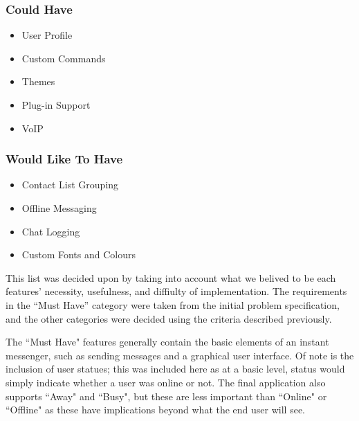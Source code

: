 \subsubsection{Could Have}

\begin{itemize}
\item{User Profile}
\item{Custom Commands}
\item{Themes}
\item{Plug-in Support}
\item{VoIP}
\end{itemize}

\subsubsection{Would Like To Have}

\begin{itemize}
\item{Contact List Grouping}
\item{Offline Messaging}
\item{Chat Logging}
\item{Custom Fonts and Colours}
\end{itemize}

This list was decided upon by taking into account what we belived to be each features' necessity, usefulness, and diffiulty of implementation. The requirements in the ``Must Have'' category were taken from the initial problem specification, and the other categories were decided using the criteria described previously.

The ``Must Have" features generally contain the basic elements of an instant messenger, such as sending messages and a graphical user interface. Of note is the inclusion of user statues; this was included here as at a basic level, status would simply indicate whether a user was online or not. The final application also supports ``Away" and ``Busy", but these are less important than ``Online" or ``Offline" as these have implications beyond what the end user will see.

